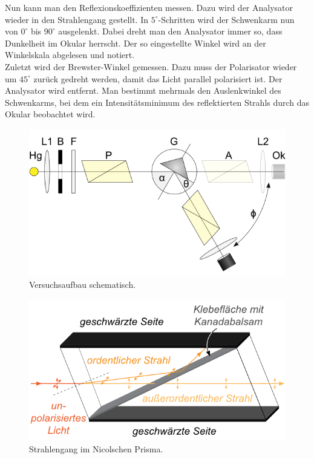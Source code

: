 \documentclass[12pt,a4paper,titlepage,headinclude,bibtotoc]{scrartcl}
\begin{document}
Nun kann man den Reflexionskoeffizienten messen.
Dazu wird der Analysator wieder in den Strahlengang gestellt.
In $5^\circ$-Schritten wird der Schwenkarm nun von $0^\circ$ bis $90^\circ$ ausgelenkt.
Dabei dreht man den Analysator immer so, dass Dunkelheit im Okular herrscht.
Der so eingestellte Winkel wird an der Winkelskala abgelesen und notiert.\\

Zuletzt wird der Brewster-Winkel gemessen.
Dazu muss der Polarisator wieder um $45^\circ$ zurück gedreht werden, damit das Licht parallel polarisiert ist.
Der Analysator wird entfernt.
Man bestimmt mehrmals den Auslenkwinkel des Schwenkarms, bei dem ein Intensitätsminimum des reflektierten Strahls durch das Okular beobachtet wird.

\begin{figure}[!h]
	\centering
	\includegraphics[scale=0.7]{aufbau_schema.png}
	\caption{Versuchsaufbau schematisch. \cite[Datum: 23.03.2015]{LP20}}
	\label{fig:aufbau}
\end{figure}
\begin{figure}[!h]
	\centering
	\includegraphics[scale=0.7]{nicol.png}
	\caption{Strahlengang im Nicolschen Prisma. \cite[Datum: 23.03.2015]{LP20}}
	\label{fig:nicol}
\end{figure}
\end{document}
